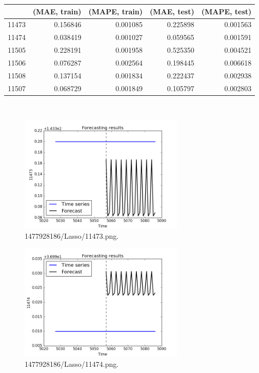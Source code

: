 \documentclass[12pt]{article}
\begin{document}
\begin{tabular}{lrrrr}
\toprule
{} &  (MAE, train) &  (MAPE, train) &  (MAE, test) &  (MAPE, test) \\
\midrule
11473 &      0.156846 &       0.001085 &     0.225898 &      0.001563 \\
11474 &      0.038419 &       0.001027 &     0.059565 &      0.001591 \\
11505 &      0.228191 &       0.001958 &     0.525350 &      0.004521 \\
11506 &      0.076287 &       0.002564 &     0.198445 &      0.006618 \\
11508 &      0.137154 &       0.001834 &     0.222437 &      0.002938 \\
11507 &      0.068729 &       0.001849 &     0.105797 &      0.002803 \\
\bottomrule
\end{tabular}
\bigskip 
 \\
\begin{figure}
\includegraphics[width=0.7\textwidth]{1477928186/Lasso/11473.png}
\caption{1477928186/Lasso/11473.png.} \label{fg:1477928186/Lasso/11473.png}
\end{figure}

\begin{figure}
\includegraphics[width=0.7\textwidth]{1477928186/Lasso/11474.png}
\caption{1477928186/Lasso/11474.png.} \label{fg:1477928186/Lasso/11474.png}
\end{figure}
\end{document}
